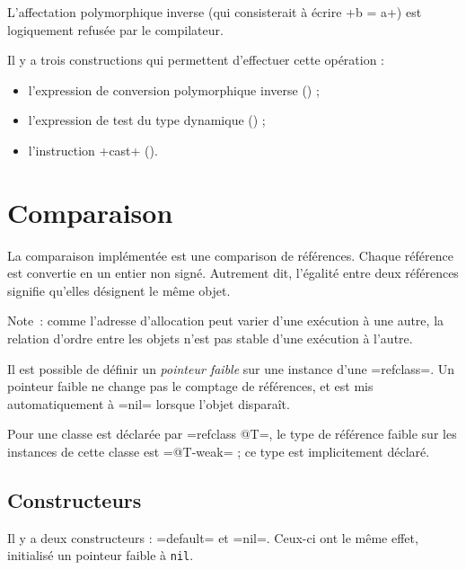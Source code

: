 L'affectation polymorphique inverse (qui consisterait à écrire \ggs+b = a+) est logiquement refusée par le compilateur.

Il y a trois constructions qui permettent d'effectuer cette opération :
\begin{itemize}
  \item l'expression de conversion polymorphique inverse () ;
  \item l'expression de test du type dynamique () ;
  \item l'instruction \ggs+cast+ ().
\end{itemize}

\section{Comparaison}

La comparaison implémentée est une comparison de références. Chaque référence est convertie en un entier non signé. Autrement dit, l'égalité entre deux références signifie qu'elles désignent le même objet. 

Note~: comme l'adresse d'allocation peut varier d'une exécution à une autre, la relation d'ordre entre les objets n'est pas stable d'une exécution à l'autre.






Il est possible de définir un \emph{pointeur faible} sur une instance d'une \ggs=refclass=. Un pointeur faible ne change pas le comptage de références, et est mis automatiquement à \ggs=nil= lorsque l'objet disparaît.

Pour une classe est déclarée par \ggs=refclass @T=, le type de référence faible sur les instances de cette classe est \ggs=@T-weak= ; ce type est implicitement déclaré.







\subsection{Constructeurs}

Il y a deux constructeurs : \ggs=default= et \ggs=nil=. Ceux-ci ont le même effet, initialisé un pointeur faible à \texttt{nil}.

